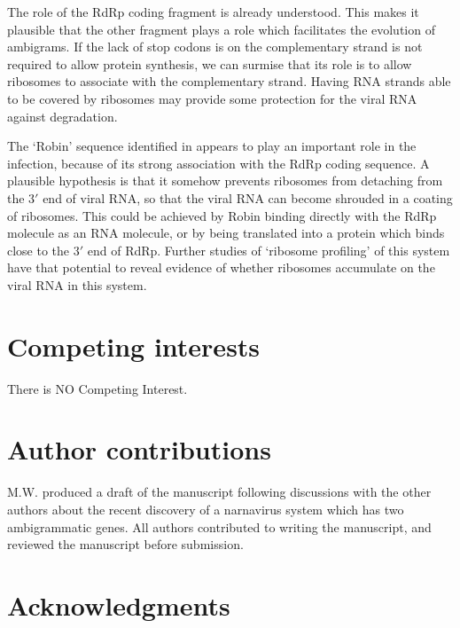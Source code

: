 \documentclass[unnumsec,webpdf,contemporary,large,namedate]{oup-authoring-template}%
\theoremstyle{thmstyleone}%
\theoremstyle{thmstyletwo}%
\theoremstyle{thmstylethree}%
\begin{document}
The role of the RdRp coding fragment 
is already understood. This makes it plausible that the other fragment plays a role which facilitates the 
evolution of ambigrams. If the lack of stop codons is on the complementary strand is not required 
to allow protein synthesis, we can surmise that its role is to allow ribosomes to associate with the 
complementary strand. Having RNA strands able to be covered by ribosomes may provide some protection 
for the viral RNA against degradation. 

The \lq Robin' sequence identified in \cite{Bat+20} appears to play an important role in the infection, 
because of its strong association with the RdRp coding sequence. A plausible hypothesis is that 
it somehow prevents ribosomes from detaching from the $3'$ end of viral RNA, 
so that the viral RNA can become shrouded in a coating of ribosomes. 
This could be achieved by Robin binding directly with the RdRp molecule as an RNA molecule, 
or by being translated into a protein which binds close to the $3'$ end of RdRp.
Further studies of \lq ribosome profiling' of this system have that potential to reveal evidence 
of whether ribosomes accumulate on the viral RNA in this system. 


\section{Competing interests}
There is NO Competing Interest.

\section{Author contributions}

M.W. produced a draft of the manuscript following discussions with the other 
authors about the recent discovery of a narnavirus system which has two 
ambigrammatic genes. All authors contributed to writing the manuscript, and 
reviewed the manuscript before submission. 


\section{Acknowledgments}
\end{document}
